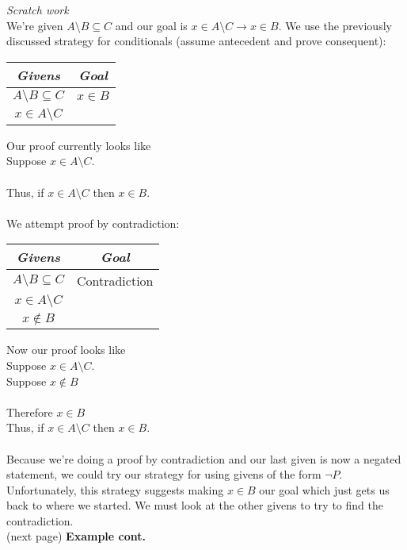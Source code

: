 \documentclass{report}
\begin{document}
\textit{Scratch work}\\
We're given $A\setminus B\subseteq C$ and our goal is $x\in A\setminus C\to x\in B$. We use the previously discussed strategy for conditionals (assume antecedent and prove consequent):
\begin{center}
\begin{tabular}{c|c}
\textit{Givens}&\textit{Goal}\\
\hline
$A\setminus B\subseteq C$&$x\in B$\\
$x\in A\setminus C$&
\end{tabular}
\end{center}
Our proof currently looks like\\
\indent Suppose $x\in A\setminus C$.\\
\indent{}\\
\indent Thus, if $x\in A\setminus C$ then $x\in B$.\\
\vspace{1mm}\\
We attempt proof by contradiction:
\begin{center}
\begin{tabular}{c|c}
\textit{Givens}&\textit{Goal}\\
\hline
$A\setminus B\subseteq C$&Contradiction\\
$x\in A\setminus C$&\\
$x\notin B$&
\end{tabular}
\end{center}
Now our proof looks like\\
\indent Suppose $x\in A\setminus C$.\\
\indent\indent Suppose $x\notin B$\\
\indent\indent{}\\
\indent\indent Therefore $x\in B$\\
\indent Thus, if $x\in A\setminus C$ then $x\in B$.\\
\vspace{1mm}\\
Because we're doing a proof by contradiction and our last given is now a negated statement, we could try our strategy for using givens of the form $\neg P$. Unfortunately, this strategy suggests
making $x\in B$ our goal which just gets us back to where we started. We must look at the other givens to try to find the contradiction.\\
(next page)\newpage
\noindent\textbf{Example cont.}\\
\end{document}
